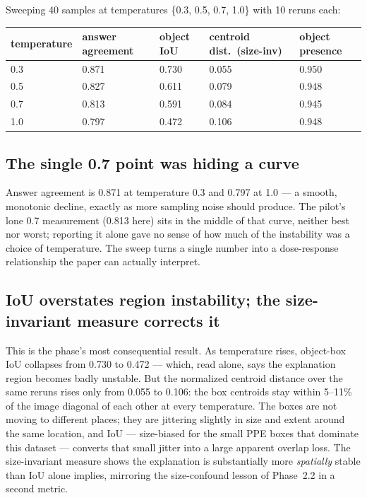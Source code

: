Sweeping 40 samples at temperatures \{0.3, 0.5, 0.7, 1.0\} with 10 reruns each:

\begin{center}
\begin{tabular}{p{2.4cm}p{2.8cm}p{2.6cm}p{3.2cm}p{2.4cm}}
\toprule
\textbf{temperature} & \textbf{answer agreement} & \textbf{object IoU} & \textbf{centroid dist.\ (size-inv)} & \textbf{object presence} \\
\midrule
0.3 & 0.871 & 0.730 & 0.055 & 0.950 \\
0.5 & 0.827 & 0.611 & 0.079 & 0.948 \\
0.7 & 0.813 & 0.591 & 0.084 & 0.945 \\
1.0 & 0.797 & 0.472 & 0.106 & 0.948 \\
\bottomrule
\end{tabular}
\label{tab:p23-sweep}
\end{center}

\subsection{The single 0.7 point was hiding a curve}

Answer agreement is 0.871 at temperature 0.3 and 0.797 at 1.0 --- a smooth, monotonic decline, exactly
as more sampling noise should produce. The pilot's lone 0.7 measurement (0.813 here) sits in the middle
of that curve, neither best nor worst; reporting it alone gave no sense of how much of the instability
was a choice of temperature. The sweep turns a single number into a dose-response relationship the
paper can actually interpret.

\subsection{IoU overstates region instability; the size-invariant measure corrects it}

This is the phase's most consequential result. As temperature rises, object-box IoU collapses from
0.730 to 0.472 --- which, read alone, says the explanation region becomes badly unstable. But the
normalized centroid distance over the same reruns rises only from 0.055 to 0.106: the box centroids
stay within 5--11\% of the image diagonal of each other at every temperature. The boxes are not moving
to different places; they are jittering slightly in size and extent around the same location, and IoU ---
size-biased for the small PPE boxes that dominate this dataset --- converts that small jitter into a
large apparent overlap loss. The size-invariant measure shows the explanation is substantially more
\emph{spatially} stable than IoU alone implies, mirroring the size-confound lesson of Phase~2.2 in a
second metric.

